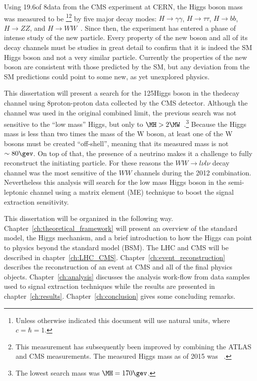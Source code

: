 Using 19.6\fbinv of 8\tev data from the CMS experiment at CERN, the Higgs boson mass was measured to be \footnote{Unless otherwise indicated this document will use natural units, where $c=\hbar=1$.}\footnote{This measurement has subsequently been improved by combining the ATLAS and CMS measurements. The measured Higgs mass as of 2015 was ~\cite{Aad:2015zhl}.} by five major decay modes: $H\rightarrow\gamma\gamma$, $H\rightarrow\tau\tau$, $H\rightarrow{bb}$, $H\rightarrow{ZZ}$, and $H\rightarrow{WW}$~\cite{CMS-PAS-HIG-13-005}.
Since then, the experiment has entered a phase of intense study of the new particle.
Every property of the new boson and all of its decay channels must be studies in great detail to confirm that it is indeed the SM Higgs boson and not a very similar particle.
Currently the properties of the new boson are consistent with those predicted by the SM, but any deviation from the SM predictions could point to some new, as yet unexplored physics.

This dissertation will present a search for the 125\gev Higgs boson in the the\newline\HWWlnujj decay channel using 8\tev proton-proton data collected by the CMS detector.
Although the \HWWlnujj channel was used in the original combined limit, the previous search was not sensitive to the ``low mass'' Higgs, but only to 
$\MH>2\MW$~\cite{CMS-PAS-HIG-13-027}.\footnote{The lowest search mass was $\MH=170\gev$.}
Because the Higgs mass is less than two times the mass of the W boson, at least one of the W bosons must be created ``off-shell'', meaning that its measured mass is not $\sim80\gev$.
On top of that, the presence of a neutrino makes it a challenge to fully reconstruct the initiating particle.
For these reasons the $WW\rightarrow{l\nu}{l\nu}$ decay channel was the most sensitive of the $WW$ channels during the 2012 combination.
Nevertheless this analysis will search for the low mass Higgs boson in the semi-leptonic channel using a matrix element (ME) technique to boost the signal extraction sensitivity.

This dissertation will be organized in the following way.
Chapter~\ref{ch:theoretical_framework} will present an overview of the standard model, the Higgs mechanism, and a brief introduction to how the Higgs can point to physics beyond the standard model (BSM).
The LHC and CMS will be described in chapter~\ref{ch:LHC_CMS}.
Chapter~\ref{ch:event_reconstruction} describes the reconstruction of an event at CMS and all of the final physics objects.
Chapter~\ref{ch:analysis} discusses the analysis work-flow from data samples used to signal extraction techniques while the results are presented in chapter~\ref{ch:results}.
Chapter~\ref{ch:conclusion} gives some concluding remarks.

